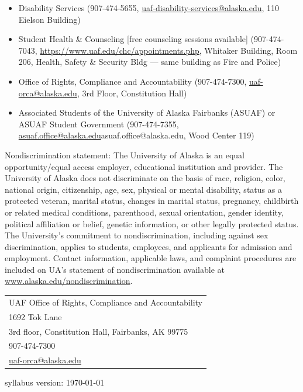 \documentclass[12pt]{article}
\def\mailto#1{\href{mailto:#1}{#1}}
\begin{document}
\begin{itemize}
\setlength\itemsep{0em}
\item Disability Services (907-474-5655, \mailto{uaf-disability-services@alaska.edu}, 110 Eielson Building)
\item Student Health \& Counseling [free counseling sessions available] (907-474-7043, \url{https://www.uaf.edu/chc/appointments.php}, Whitaker Building, Room 206, Health, Safety \& Security Bldg --- same building as Fire and Police)
\item Office of Rights, Compliance and Accountability (907-474-7300, \mailto{uaf-orca@alaska.edu}, 3rd Floor, Constitution Hall)
\item Associated Students of the University of Alaska Fairbanks (ASUAF) or ASUAF Student Government (907-474-7355, \mailto{asuaf.office@alaska.edu}{asuaf.office@alaska.edu}, Wood Center 119)
\end{itemize}

Nondiscrimination statement: The University of Alaska is an equal opportunity/equal access employer, educational institution and provider. The University of Alaska does not discriminate on the basis of race, religion, color, national origin, citizenship, age, sex, physical or mental disability, status as a protected veteran, marital status, changes in marital status, pregnancy, childbirth or related medical conditions, parenthood, sexual orientation, gender identity, political affiliation or belief, genetic information, or other legally protected status. The University's commitment to nondiscrimination, including against sex discrimination, applies to students, employees, and applicants for admission and employment. Contact information, applicable laws, and complaint procedures are included on UA's statement of nondiscrimination available at \url{www.alaska.edu/nondiscrimination}.

\begin{tabular}{l}
UAF Office of Rights, Compliance and Accountability\\
1692 Tok Lane\\
3rd floor, Constitution Hall, Fairbanks, AK 99775\\
907-474-7300\\
\url{uaf-orca@alaska.edu}
\end{tabular}


 \scriptsize syllabus version: \today \normalsize
\end{document}
